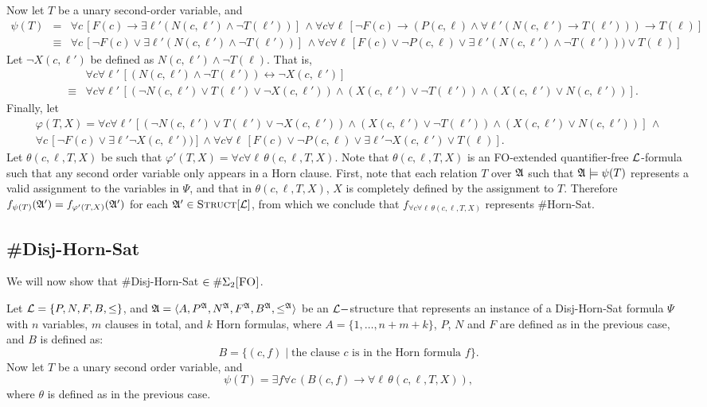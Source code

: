 Now let $T$ be a unary second-order variable, and
\begin{align*}
	\psi(T) &=& \forall c\,[ F(c) \to \exists \ell'(N(c,\ell') \wedge \neg T(\ell'))]
	\,\wedge
	 \forall c \forall \ell\, [\neg F(c)\to(P(c,\ell)\wedge\forall\ell'(N(c,\ell')\to T(\ell')))\to T(\ell)] \\
	 &\equiv& \forall c\,[ \neg F(c) \vee \exists \ell'(N(c,\ell') \wedge \neg T(\ell'))]
	 \,\wedge
	 \forall c \forall \ell\, [ F(c) \vee \neg P(c,\ell) \vee \exists\ell'(N(c,\ell') \wedge \neg T(\ell'))) \vee T(\ell)]
\end{align*}
Let $\neg X(c,\ell')$ be defined as $N(c,\ell')\wedge \neg T(\ell)$. That is,
\begin{eqnarray*}
	&& \forall c \forall \ell'\, [(N(c,\ell') \wedge \neg T(\ell')) \leftrightarrow \neg X(c,\ell')]\\
	&\equiv& \forall c \forall \ell'\,[(\neg N(c,\ell')\vee T(\ell')\vee \neg X(c,\ell'))\wedge (X(c,\ell')\vee \neg T(\ell'))\wedge (X(c,\ell')\vee N(c,\ell'))].
\end{eqnarray*}
Finally, let
\begin{multline*}
	\varphi(T,X) = \forall c \forall \ell'\,[(\neg N(c,\ell')\vee T(\ell')\vee \neg X(c,\ell'))\wedge (X(c,\ell')\vee \neg T(\ell'))\wedge (X(c,\ell')\vee N(c,\ell'))]\,\wedge \\
	\forall c\,[ \neg F(c) \vee \exists \ell'\neg X(c,\ell'))]
	\wedge
	\forall c \forall \ell\, [ F(c) \vee \neg P(c,\ell) \vee \exists\ell'\neg X(c,\ell') \vee T(\ell)].
\end{multline*}
Let $\theta(c,\ell,T,X)$ be such that $\varphi'(T,X) = \forall c \forall \ell\,\theta(c,\ell,T,X)$. Note that $\theta(c,\ell,T,X)$ is an {\sc FO}-extended quantifier-free ${\cal L}$-formula such that any second order variable only appears in a Horn clause. First, note that each relation $T$ over ${\frak A}$ such that ${\frak A}\models \psi(T)$ represents a valid assignment to the variables in $\Psi$, and that in $\theta(c,\ell,T,X)$, $X$ is completely defined by the assignment to $T$. Therefore $f_{\psi(T)}({\frak A}') = f_{\varphi'(T,X)}({\frak A}')$ for each ${\frak A}'\in\textsc{Struct}[{\cal L}]$, from which we conclude that $f_{\forall c \forall \ell\,\theta(c,\ell,T,X)}$ represents {\sc \#Horn-Sat}. 

\subsection{{\sc \#Disj-Horn-Sat}}
We will now show that {\sc \#Disj-Horn-Sat} $\in\#\Sigma_{2}\textsc{[FO]}$.

Let ${\cal L} = \{P,N,F,B,\leq\}$, and ${\frak A} = \langle A, P^{\frak A}, N^{\frak A}, F^{\frak A}, B^{\frak A}, \leq^{\frak A} \rangle$ be an ${\cal L}-$structure that represents an instance of a {\sc Disj-Horn-Sat} formula $\Psi$ with $n$ variables, $m$ clauses in total, and $k$ Horn formulas, where $A = \{1,\ldots,n+m+k\}$, $P$, $N$ and $F$ are defined as in the previous case, and $B$ is defined as:
\[
	B = \{ (c,f) \mid 
		\mbox{the clause $c$ is in the Horn formula $f$}
	\}.
\]
Now let $T$ be a unary second order variable, and
\[
	\psi(T) = \exists f\forall c\,(B(c,f)\to \forall\ell\,\theta(c,\ell,T,X)),
\]
where $\theta$ is defined as in the previous case.